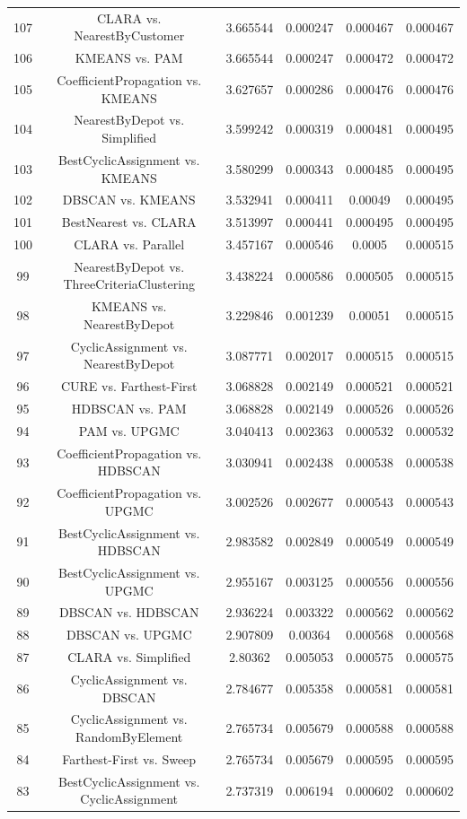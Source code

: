 \documentclass[a4paper,10pt]{article}
\begin{document}
\begin{landscape}
\begin{table}[!htp]
\begin{tabular}{cccccc}
107&CLARA vs. NearestByCustomer&3.665544&0.000247&0.000467&0.000467\\
106&KMEANS vs. PAM&3.665544&0.000247&0.000472&0.000472\\
105&CoefficientPropagation vs. KMEANS&3.627657&0.000286&0.000476&0.000476\\
104&NearestByDepot vs. Simplified&3.599242&0.000319&0.000481&0.000495\\
103&BestCyclicAssignment vs. KMEANS&3.580299&0.000343&0.000485&0.000495\\
102&DBSCAN vs. KMEANS&3.532941&0.000411&0.00049&0.000495\\
101&BestNearest vs. CLARA&3.513997&0.000441&0.000495&0.000495\\
100&CLARA vs. Parallel&3.457167&0.000546&0.0005&0.000515\\
99&NearestByDepot vs. ThreeCriteriaClustering&3.438224&0.000586&0.000505&0.000515\\
98&KMEANS vs. NearestByDepot&3.229846&0.001239&0.00051&0.000515\\
97&CyclicAssignment vs. NearestByDepot&3.087771&0.002017&0.000515&0.000515\\
96&CURE vs. Farthest-First&3.068828&0.002149&0.000521&0.000521\\
95&HDBSCAN vs. PAM&3.068828&0.002149&0.000526&0.000526\\
94&PAM vs. UPGMC&3.040413&0.002363&0.000532&0.000532\\
93&CoefficientPropagation vs. HDBSCAN&3.030941&0.002438&0.000538&0.000538\\
92&CoefficientPropagation vs. UPGMC&3.002526&0.002677&0.000543&0.000543\\
91&BestCyclicAssignment vs. HDBSCAN&2.983582&0.002849&0.000549&0.000549\\
90&BestCyclicAssignment vs. UPGMC&2.955167&0.003125&0.000556&0.000556\\
89&DBSCAN vs. HDBSCAN&2.936224&0.003322&0.000562&0.000562\\
88&DBSCAN vs. UPGMC&2.907809&0.00364&0.000568&0.000568\\
87&CLARA vs. Simplified&2.80362&0.005053&0.000575&0.000575\\
86&CyclicAssignment vs. DBSCAN&2.784677&0.005358&0.000581&0.000581\\
85&CyclicAssignment vs. RandomByElement&2.765734&0.005679&0.000588&0.000588\\
84&Farthest-First vs. Sweep&2.765734&0.005679&0.000595&0.000595\\
83&BestCyclicAssignment vs. CyclicAssignment&2.737319&0.006194&0.000602&0.000602\\

\end{tabular}
\end{table}
\end{landscape}
\end{document}

